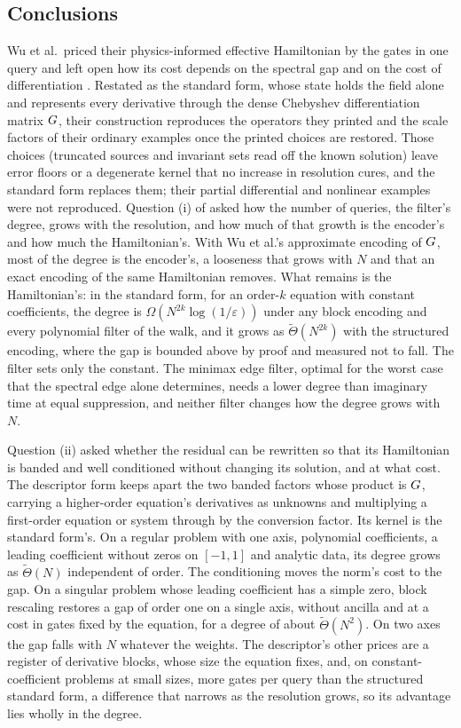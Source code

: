 \subsection{Conclusions}
\label{sec:conclusions-answers}

Wu et al.\ priced their physics-informed effective Hamiltonian by the gates in one query and left open how its cost depends on the spectral gap and on the cost of differentiation \cite{wu2025pihm}. Restated as the standard form, whose state holds the field alone and represents every derivative through the dense Chebyshev differentiation matrix $G$, their construction reproduces the operators they printed and the scale factors of their ordinary examples once the printed choices are restored. Those choices (truncated sources and invariant sets read off the known solution) leave error floors or a degenerate kernel that no increase in resolution cures, and the standard form replaces them; their partial differential and nonlinear examples were not reproduced. Question (i) of  asked how the number of queries, the filter's degree, grows with the resolution, and how much of that growth is the encoder's and how much the Hamiltonian's. With Wu et al.'s approximate encoding of $G$, most of the degree is the encoder's, a looseness that grows with $N$ and that an exact encoding of the same Hamiltonian removes. What remains is the Hamiltonian's: in the standard form, for an order-$k$ equation with constant coefficients, the degree is $\Omega(N^{2k}\log(1/\varepsilon))$ under any block encoding and every polynomial filter of the walk, and it grows as $\tilde\Theta(N^{2k})$ with the structured encoding, where the gap is bounded above by proof and measured not to fall. The filter sets only the constant. The minimax edge filter, optimal for the worst case that the spectral edge alone determines, needs a lower degree than imaginary time at equal suppression, and neither filter changes how the degree grows with $N$.

Question (ii) asked whether the residual can be rewritten so that its Hamiltonian is banded and well conditioned without changing its solution, and at what cost. The descriptor form keeps apart the two banded factors whose product is $G$, carrying a higher-order equation's derivatives as unknowns and multiplying a first-order equation or system through by the conversion factor. Its kernel is the standard form's. On a regular problem with one axis, polynomial coefficients, a leading coefficient without zeros on $[-1,1]$ and analytic data, its degree grows as $\tilde\Theta(N)$ independent of order. The conditioning moves the norm's cost to the gap. On a singular problem whose leading coefficient has a simple zero, block rescaling restores a gap of order one on a single axis, without ancilla and at a cost in gates fixed by the equation, for a degree of about $\tilde\Theta(N^2)$. On two axes the gap falls with $N$ whatever the weights. The descriptor's other prices are a register of derivative blocks, whose size the equation fixes, and, on constant-coefficient problems at small sizes, more gates per query than the structured standard form, a difference that narrows as the resolution grows, so its advantage lies wholly in the degree.

